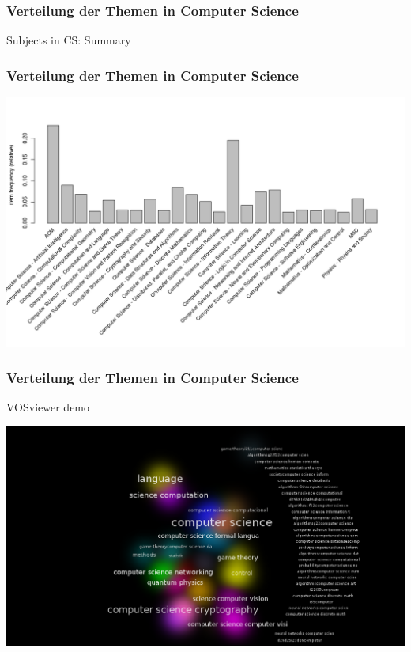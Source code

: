 \documentclass[12pt, xcolor=table]{beamer}
\begin{document}
\begin{frame}[fragile]
    \frametitle{Verteilung der Themen in Computer Science}
    \begin{block}{Subjects in CS: Summary}
    	
	\end{block}
\end{frame}

\begin{frame}
	\frametitle{Verteilung der Themen in Computer Science}
	\begin{center}
		\includegraphics[scale=0.4]{../../visual/csFrequent_filter_acm_and_msc.png}
	\end{center}
\end{frame}
\begin{frame}
	\frametitle{Verteilung der Themen in Computer Science}
    VOSviewer demo
	\begin{center}
		\includegraphics[scale=0.25]{../../visual/cs_subs_cluster_density.png}
	\end{center}
\end{frame}
\end{document}
